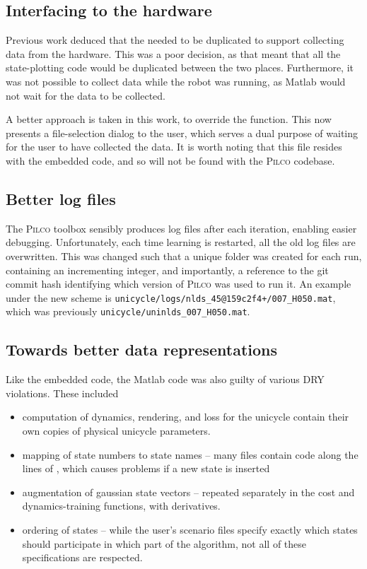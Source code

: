 \documentclass[main.tex]{subfiles}
\begin{document}
\subsection{Interfacing to the hardware}

	Previous work deduced that the  needed to be duplicated to support collecting data from the hardware.
	This was a poor decision, as that meant that all the state-plotting code would be duplicated between the two places.
	Furthermore, it was not possible to collect data while the robot was running, as Matlab would not wait for the data to be collected.

	A better approach is taken in this work, to override the  function.
	This now presents a file-selection dialog to the user, which serves a dual purpose of waiting for the user to have collected the data.
	It is worth noting that this file resides with the embedded code, and so will not be found with the \textsc{Pilco} codebase.

\subsection{Better log files}

	The \textsc{Pilco} toolbox sensibly produces log files after each iteration, enabling easier debugging.
	Unfortunately, each time learning is restarted, all the old log files are overwritten.
	This was changed such that a unique folder was created for each run, containing an incrementing integer, and importantly, a reference to the git commit hash identifying which version of \textsc{Pilco} was used to run it. An example under the new scheme is \lstinline{unicycle/logs/nlds_45@159c2f4+/007_H050.mat}, which was previously \lstinline{unicycle/uninlds_007_H050.mat}.

\subsection{Towards better data representations}

	Like the embedded code, the Matlab code was also guilty of various DRY violations.
	These included
	\begin{itemize}[noitemsep]
		\item computation of dynamics, rendering, and loss for the unicycle contain their own copies of physical unicycle parameters.
		\item mapping of state numbers to state names -- many files contain code along the lines of , which causes problems if a new state is inserted
		\item augmentation of gaussian state vectors -- repeated separately in the cost and dynamics-training functions, with derivatives.
		\item ordering of states -- while the user's scenario files specify exactly which states should participate in which part of the algorithm, not all of these specifications are respected.
	\end{itemize}
\end{document}
